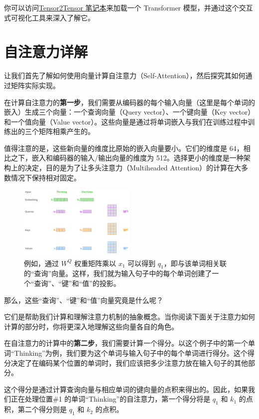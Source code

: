 \documentclass[cn,hazy,blue,10pt,normal]{elegantnote}
\begin{document}
你可以访问\href{https://colab.research.google.com/github/tensorflow/tensor2tensor/blob/master/tensor2tensor/notebooks/hello_t2t.ipynb}{Tensor2Tensor 笔记本}来加载一个 Transformer 模型，并通过这个交互式可视化工具来深入了解它。

\section{自注意力详解}

让我们首先了解如何使用向量计算自注意力（Self-Attention），然后探究其如何通过矩阵实际实现。

在计算自注意力的\textbf{第一步}，我们需要从编码器的每个输入向量（这里是每个单词的嵌入）生成三个向量：一个查询向量（Query vector）、一个键向量（Key vector）和一个值向量（Value vector）。这些向量是通过将单词嵌入与我们在训练过程中训练出的三个矩阵相乘产生的。

值得注意的是，这些新向量的维度比原始的嵌入向量要小。它们的维度是 64，相比之下，嵌入和编码器的输入/输出向量的维度为 512。选择更小的维度是一种架构上的决定，目的是为了让多头注意力（Multiheaded Attention）的计算在大多数情况下保持相对固定。

\begin{figure}[htbp]
	\centering
	\includegraphics[width=0.5\textwidth]{image/transformer_self_attention_vectors.png}
	\caption{例如，通过 $W^Q$ 权重矩阵乘以 $x_1$ 可以得到 $q_1$，即与该单词相关联的“查询”向量。这样，我们就为输入句子中的每个单词创建了一个“查询”、“键”和“值”的投影。
	}
\end{figure}

那么，这些“查询”、“键”和“值”向量究竟是什么呢？

它们是帮助我们计算和理解注意力机制的抽象概念。当你阅读下面关于注意力如何计算的部分时，你将更深入地理解这些向量各自的角色。

在自注意力的计算中的\textbf{第二步}，我们需要计算一个得分。以这个例子中的第一个单词“Thinking”为例，我们要为这个单词与输入句子中的每个单词进行得分。这个得分决定了在编码某个位置的单词时，我们应该把多少注意力放在输入句子的其他部分。

这个得分是通过计算查询向量与相应单词的键向量的点积来得出的。因此，如果我们正在处理位置\#1 的单词“Thinking”的自注意力，第一个得分将是 $q_1$ 和 $k_1$ 的点积，第二个得分则是 $q_1$ 和 $k_2$ 的点积。
\end{document}
